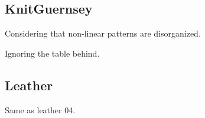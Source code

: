 \documentclass[12pt,a4paper]{article}
\begin{document}
\begin{singlespace}
\clearpage
\renewcommand{\mat}{KnitGuernsey}
\subsection{\mat}
Considering that non-linear patterns are disorganized.

\renewcommand{\Number}{01}\InputImage{\sexor}{\tco}{\sexor}{\tco}{\sexdi}{\tbu}
{}{}
\renewcommand{\Number}{02}\InputImage{\sexor}{\tco}{\sexor}{\tco}{\sexdi}{\tco}
{}{Ignoring the table behind.}
\renewcommand{\Number}{03}\InputImage{\sro}{\tco}{\sro}{\tco}{\sexdi}{\tbu}
{}{}
\renewcommand{\Number}{04}\InputImage{\sro}{\tco}{\sro}{\tco}{\sexor}{\tbu}
{}{}
\renewcommand{\Number}{05}\InputImage{\sexor}{\tco}{\sexor}{\tco}{\sexdi}{\tbu}
{}{}
\renewcommand{\Number}{06}\InputImage{\sexdi}{\tco}{\sexdi}{\tco}{\sexdi}{\tbu}
{}{}
\renewcommand{\Number}{07}\InputImage{\sro}{\tco}{\sexdi}{\tco}{\sexdi}{\tbu}
{}{}
\renewcommand{\Number}{08}\InputImage{\sexor}{\tco}{\sexor}{\tco}{\sexdi}{\tbu}
{}{}
\renewcommand{\Number}{09}\InputImage{\sro}{\tco}{\sro}{\tco}{\sexdi}{\tbu}
{}{}
\renewcommand{\Number}{10}\InputImage{\sro}{\tco}{\sro}{\tco}{\sexdi}{\tbu}
{}{}
\renewcommand{\Number}{11}\InputImage{\sro}{\tco}{\sro}{\tco}{\sexdi}{\tbu}
{}{}
\renewcommand{\Number}{12}\InputImage{\sro}{\tco}{\sexdi}{\tco}{\sexdi}{\tbu}
{}{}

\clearpage
\renewcommand{\mat}{Leather}
\subsection{\mat}

\renewcommand{\Number}{01}\InputImage{\sro}{\tsm}{\sro}{\tbu}{\sro}{\tbu}
{}{}
\renewcommand{\Number}{02}\InputImage{\sro}{\tsm}{\sro}{\tbu}{\sro}{\tbu}
{}{}
\renewcommand{\Number}{03}\InputImage{\sro}{\tco}{\sro}{\tbu}{\sro}{\tbu}
{}{}
\renewcommand{\Number}{04}\InputImage{\sro}{\tsm}{\sro}{\tbu}{\sro}{\tbu}
{}{}
\renewcommand{\Number}{05}\InputImage{\sro}{\tsm}{\sro}{\tbu}{\sro}{\tbu}
{}{Same as leather 04.}
\renewcommand{\Number}{06}\InputImage{\sro}{\tsm}{\sro}{\tbu}{\sro}{\tbu}
{}{}
\renewcommand{\Number}{07}\InputImage{\sro}{\tsm}{\sro}{\tbu}{\sro}{\tbu}
{}{}
\renewcommand{\Number}{08}\InputImage{\sro}{\tsm}{\sro}{\tbu}{\sro}{\tbu}
{}{}
\renewcommand{\Number}{09}\InputImage{\sro}{\tsm}{\sro}{\tbu}{\sro}{\tbu}
{}{}
\renewcommand{\Number}{10}\InputImage{\sro}{\tsm}{\sro}{\tbu}{\sro}{\tbu}
{}{}
\renewcommand{\Number}{11}\InputImage{\sro}{\tsm}{\sro}{\tbu}{\sexor}{\tbu}
{}{}
\renewcommand{\Number}{12}\InputImage{\sro}{\tco}{\sro}{\tbu}{\sro}{\tbu}
{}{}


\end{singlespace}
\end{document}
